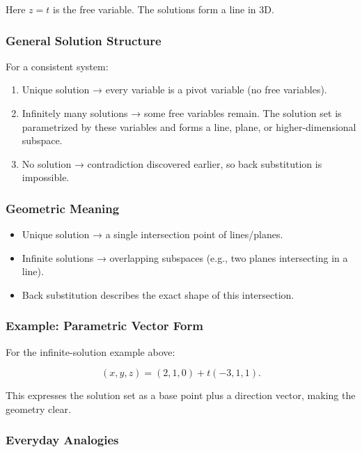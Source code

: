 \documentclass[
  letterpaper,
  DIV=11,
  numbers=noendperiod]{scrreprt}
\providecommand{\tightlist}{%
  \setlength{\itemsep}{0pt}\setlength{\parskip}{0pt}}
\begin{document}
Here \(z = t\) is the free variable. The solutions form a line in 3D.

\subsubsection{General Solution
Structure}\label{general-solution-structure}

For a consistent system:

\begin{enumerate}
\def\labelenumi{\arabic{enumi}.}
\tightlist
\item
  Unique solution → every variable is a pivot variable (no free
  variables).
\item
  Infinitely many solutions → some free variables remain. The solution
  set is parametrized by these variables and forms a line, plane, or
  higher-dimensional subspace.
\item
  No solution → contradiction discovered earlier, so back substitution
  is impossible.
\end{enumerate}

\subsubsection{Geometric Meaning}\label{geometric-meaning-2}

\begin{itemize}
\tightlist
\item
  Unique solution → a single intersection point of lines/planes.
\item
  Infinite solutions → overlapping subspaces (e.g., two planes
  intersecting in a line).
\item
  Back substitution describes the exact shape of this intersection.
\end{itemize}

\subsubsection{Example: Parametric Vector
Form}\label{example-parametric-vector-form}

For the infinite-solution example above:

\[
(x, y, z) = (2, 1, 0) + t(-3, 1, 1).
\]

This expresses the solution set as a base point plus a direction vector,
making the geometry clear.

\subsubsection{Everyday Analogies}\label{everyday-analogies-24}
\end{document}
